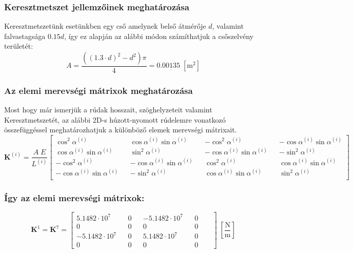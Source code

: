 \documentclass[12pt,a4paper]{article}
\def\mx#1{\mathbf{#1}}
\def\mm{\; \left[\mathrm{m^2}\right]}
\def\i{\left(i\right)}
\def\cosalfa{\cos \alpha^{\i}}
\def\sinalfa{\sin \alpha^{\i}}
\def\cosalfasq{\cos^2 \alpha^{\i}}
\def\sinalfasq{\sin^2 \alpha^{\i}}
\def\Nm{\; \left[\mathrm{\frac{N}{m}}\right]}
\def\futyi{\cdot 10^{7}}
\begin{document}
\subsubsection{Keresztmetszet jellemzőinek meghatározása}
Keresztmetszetünk esetünkben egy cső amelynek belső átmérője $d$, valamint falvastagsága
$0.15 d$, így ez alapján az alábbi módon számíthatjuk a csőszelvény területét:
\begin{equation}
    A=\frac{\left(\left(1.3 \cdot d\right)^2-d^2\right) \pi }
    {4}=0.00135 \mm
\end{equation}
\subsubsection{Az elemi merevségi mátrixok meghatározása}
Most hogy már ismerjük a rúdak hosszait, szöghelyzeteit valamint Keresztmetszetét,
az alábbi 2D-s húzott-nyomott rúdelemre vonatkozó összefüggéssel meghatározhatjuk a
különböző elemek merevségi mátrixait.
\begin{equation}
    \mx{K}^{\i}=\frac{A \; E}{L^{\i}}
    \begin{bmatrix}
        \cosalfasq          &  & \cosalfa \sinalfa   &  & -\cosalfasq          &  & - \cosalfa  \sinalfa \\
        \cosalfa  \sinalfa  &  & \sinalfasq          &  & - \cosalfa  \sinalfa &  & -\sinalfasq          \\
        -\cosalfasq         &  & -\cosalfa  \sinalfa &  & \cosalfasq           &  & \cosalfa  \sinalfa   \\
        -\cosalfa  \sinalfa &  & -\sinalfasq         &  & \cosalfa  \sinalfa   &  & \sinalfasq           \\
    \end{bmatrix}
\end{equation}
\subsubsection*{Így az elemi merevségi mátrixok:}
\begin{equation}
    \mx{K}^{1}=\mx{K}^{7}=
    \begin{bmatrix}
        5.1482 \futyi  &  & 0 &  & -5.1482 \futyi &  & 0      \\
        0              &  & 0 &  & 0              &  & 0 &  & \\
        -5.1482 \futyi &  & 0 &  & 5.1482 \futyi  &  & 0      \\
        0              &  & 0 &  & 0              &  & 0 &  &
    \end{bmatrix} \Nm
\end{equation}
\end{document}
